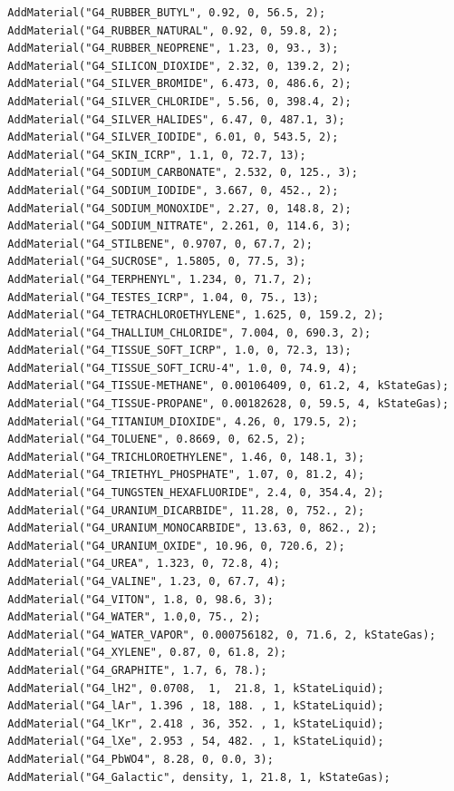 \documentclass[a4paper,12pt]{article}
\begin{document}
\begin{verbatim}
  AddMaterial("G4_RUBBER_BUTYL", 0.92, 0, 56.5, 2);
  AddMaterial("G4_RUBBER_NATURAL", 0.92, 0, 59.8, 2);
  AddMaterial("G4_RUBBER_NEOPRENE", 1.23, 0, 93., 3);
  AddMaterial("G4_SILICON_DIOXIDE", 2.32, 0, 139.2, 2);
  AddMaterial("G4_SILVER_BROMIDE", 6.473, 0, 486.6, 2);
  AddMaterial("G4_SILVER_CHLORIDE", 5.56, 0, 398.4, 2);
  AddMaterial("G4_SILVER_HALIDES", 6.47, 0, 487.1, 3);
  AddMaterial("G4_SILVER_IODIDE", 6.01, 0, 543.5, 2);
  AddMaterial("G4_SKIN_ICRP", 1.1, 0, 72.7, 13);
  AddMaterial("G4_SODIUM_CARBONATE", 2.532, 0, 125., 3);
  AddMaterial("G4_SODIUM_IODIDE", 3.667, 0, 452., 2);
  AddMaterial("G4_SODIUM_MONOXIDE", 2.27, 0, 148.8, 2);
  AddMaterial("G4_SODIUM_NITRATE", 2.261, 0, 114.6, 3);
  AddMaterial("G4_STILBENE", 0.9707, 0, 67.7, 2);
  AddMaterial("G4_SUCROSE", 1.5805, 0, 77.5, 3);
  AddMaterial("G4_TERPHENYL", 1.234, 0, 71.7, 2);
  AddMaterial("G4_TESTES_ICRP", 1.04, 0, 75., 13);
  AddMaterial("G4_TETRACHLOROETHYLENE", 1.625, 0, 159.2, 2);
  AddMaterial("G4_THALLIUM_CHLORIDE", 7.004, 0, 690.3, 2);
  AddMaterial("G4_TISSUE_SOFT_ICRP", 1.0, 0, 72.3, 13);
  AddMaterial("G4_TISSUE_SOFT_ICRU-4", 1.0, 0, 74.9, 4);
  AddMaterial("G4_TISSUE-METHANE", 0.00106409, 0, 61.2, 4, kStateGas);
  AddMaterial("G4_TISSUE-PROPANE", 0.00182628, 0, 59.5, 4, kStateGas);
  AddMaterial("G4_TITANIUM_DIOXIDE", 4.26, 0, 179.5, 2);
  AddMaterial("G4_TOLUENE", 0.8669, 0, 62.5, 2);
  AddMaterial("G4_TRICHLOROETHYLENE", 1.46, 0, 148.1, 3);
  AddMaterial("G4_TRIETHYL_PHOSPHATE", 1.07, 0, 81.2, 4);
  AddMaterial("G4_TUNGSTEN_HEXAFLUORIDE", 2.4, 0, 354.4, 2);
  AddMaterial("G4_URANIUM_DICARBIDE", 11.28, 0, 752., 2);
  AddMaterial("G4_URANIUM_MONOCARBIDE", 13.63, 0, 862., 2);
  AddMaterial("G4_URANIUM_OXIDE", 10.96, 0, 720.6, 2);
  AddMaterial("G4_UREA", 1.323, 0, 72.8, 4);
  AddMaterial("G4_VALINE", 1.23, 0, 67.7, 4);
  AddMaterial("G4_VITON", 1.8, 0, 98.6, 3);
  AddMaterial("G4_WATER", 1.0,0, 75., 2);
  AddMaterial("G4_WATER_VAPOR", 0.000756182, 0, 71.6, 2, kStateGas);
  AddMaterial("G4_XYLENE", 0.87, 0, 61.8, 2);
  AddMaterial("G4_GRAPHITE", 1.7, 6, 78.);
  AddMaterial("G4_lH2", 0.0708,  1,  21.8, 1, kStateLiquid);
  AddMaterial("G4_lAr", 1.396 , 18, 188. , 1, kStateLiquid);
  AddMaterial("G4_lKr", 2.418 , 36, 352. , 1, kStateLiquid);
  AddMaterial("G4_lXe", 2.953 , 54, 482. , 1, kStateLiquid);
  AddMaterial("G4_PbWO4", 8.28, 0, 0.0, 3);
  AddMaterial("G4_Galactic", density, 1, 21.8, 1, kStateGas);
 \end{verbatim}
 \newpage
 
\end{document}

